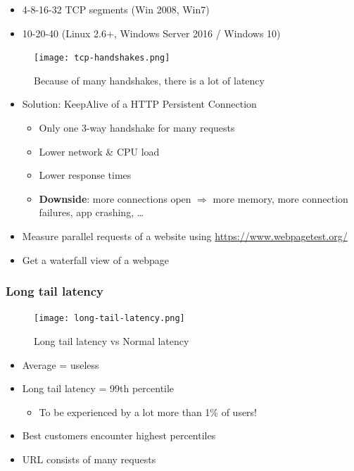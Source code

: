 \documentclass{article}
\begin{document}
\begin{itemize}
    \item 4-8-16-32 TCP segments (Win 2008, Win7)
    \item 10-20-40 (Linux 2.6+, Windows Server 2016 / Windows 10)
\end{itemize}

\begin{figure}[H]
    \centering
    \texttt{[image: tcp-handshakes.png]}
    \caption{Because of many handshakes, there is a lot of latency}
\end{figure}

\begin{itemize}
    \item Solution: KeepAlive of a HTTP Persistent Connection
    \begin{itemize}
        \item Only one 3-way handshake for many requests
        \item Lower network \& CPU load
        \item Lower response times
        \item \textbf{Downside}: more connections open $\Rightarrow$ more memory, more connection failures, app crashing, \dots
    \end{itemize}
\end{itemize}

\begin{itemize}
    \item Measure parallel requests of a website using \url{https://www.webpagetest.org/}
    \item Get a waterfall view of a webpage
\end{itemize}

\subsubsection{Long tail latency}

\begin{figure}[H]
    \centering
    \texttt{[image: long-tail-latency.png]}
    \caption{Long tail latency vs Normal latency}
\end{figure}


\begin{itemize}
    \item Average = useless
    \item Long tail latency = 99th percentile
    \begin{itemize}
        \item To be experienced by a lot more than 1\% of users!
    \end{itemize}
    \item Best customers encounter highest percentiles
    \item URL consists of many requests
\end{itemize}
\end{document}
